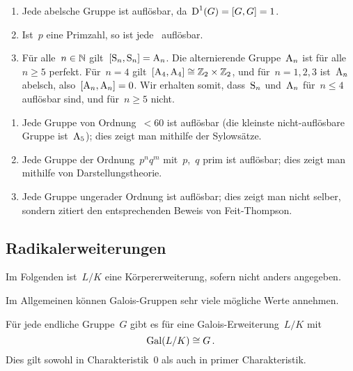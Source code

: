 \begin{example}
  \leavevmode
  \begin{enumerate}
    \item
      Jede abelsche Gruppe ist auflösbar, da~$\operatorname{D}^1(G) = [G,G] = 1$.
    \item
      Ist~$p$ eine Primzahl, so ist jede~ auflösbar.
    \item
      Für alle~$n \in \mathbb{N}$ gilt~$[\operatorname{S}_n, \operatorname{S}_n] = \operatorname{A}_n$.
      Die alternierende Gruppe~$\operatorname{A}_n$ ist für alle~$n \geq 5$ perfekt.
      Für~$n = 4$ gilt~$[\operatorname{A}_4, \operatorname{A}_4] \cong \mathbb{Z}_2 \times \mathbb{Z}_2$, und für~$n = 1, 2, 3$ ist~$\operatorname{A}_n$ abelsch, also~$[\operatorname{A}_n, \operatorname{A}_n] = 0$.
      Wir erhalten somit, dass~$\operatorname{S}_n$ und~$\operatorname{A}_n$ für~$n \leq 4$ auflösbar sind, und für~$n \geq 5$ nicht.
  \end{enumerate}
\end{example}

\begin{remark}
  \leavevmode
  \begin{enumerate}
    \item
      Jede Gruppe von Ordnung~$< 60$ ist auflösbar (die kleinste nicht-auflösbare Gruppe ist~$\operatorname{A}_5$);
      dies zeigt man mithilfe der Sylowsätze.
    \item
      Jede Gruppe der Ordnung~$p^n q^m$ mit~$p$,~$q$ prim ist auflösbar;
      dies zeigt man mithilfe von Darstellungstheorie.
    \item
      Jede Gruppe ungerader Ordnung ist auflösbar;
      dies zeigt man nicht selber, sondern zitiert den entsprechenden Beweis von Feit-Thompson.
  \end{enumerate}
\end{remark}



\subsection{Radikalerweiterungen}

\begin{convention}
  Im Folgenden ist~$L/K$ eine Körpererweiterung, sofern nicht anders angegeben.
\end{convention}

Im Allgemeinen können Galois-Gruppen sehr viele mögliche Werte annehmen.

\begin{theorem}
  Für jede endliche Gruppe~$G$ gibt es für eine Galois-Erweiterung~$L/K$ mit
  \[
    \operatorname{Gal}(L/K) \cong G \,.
  \]
  Dies gilt sowohl in Charakteristik~$0$ als auch in primer Charakteristik.
\end{theorem}

